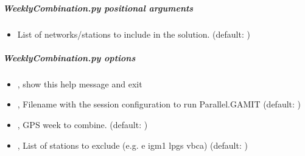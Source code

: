 \documentclass[letterpaper,10pt,english]{sphinxmanual}
\begin{document}
\subparagraph{WeeklyCombination.py positional arguments}
\label{\detokenize{pgamit.classes:WeeklyCombination.py-positional-arguments}}\begin{itemize}
\item {} 
\sphinxAtStartPar
{\hyperref[\detokenize{pgamit.classes:WeeklyCombination.py-all|net.stnm}]{}} \sphinxhyphen{} List of networks/stations to include in the solution. (default: )

\end{itemize}


\subparagraph{WeeklyCombination.py options}
\label{\detokenize{pgamit.classes:WeeklyCombination.py-options}}\begin{itemize}
\item {} 
\sphinxAtStartPar
{\hyperref[\detokenize{pgamit.classes:WeeklyCombination.py--h}]{}}, {\hyperref[\detokenize{pgamit.classes:WeeklyCombination.py---help}]{}} \sphinxhyphen{} show this help message and exit

\item {} 
\sphinxAtStartPar
{\hyperref[\detokenize{pgamit.classes:WeeklyCombination.py--s}]{}} , {\hyperref[\detokenize{pgamit.classes:WeeklyCombination.py---session_config}]{}}  \sphinxhyphen{} Filename with the session configuration to run Parallel.GAMIT (default: )

\item {} 
\sphinxAtStartPar
{\hyperref[\detokenize{pgamit.classes:WeeklyCombination.py--w}]{}} , {\hyperref[\detokenize{pgamit.classes:WeeklyCombination.py---gpsweek}]{}}  \sphinxhyphen{} GPS week to combine. (default: )

\item {} 
\sphinxAtStartPar
{\hyperref[\detokenize{pgamit.classes:WeeklyCombination.py--e}]{}} , {\hyperref[\detokenize{pgamit.classes:WeeklyCombination.py---exclude}]{}}  \sphinxhyphen{} List of stations to exclude (e.g. \sphinxhyphen{}e igm1 lpgs vbca) (default: )

\end{itemize}
\end{document}
